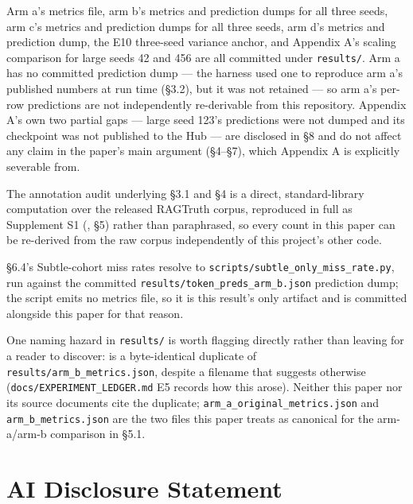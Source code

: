 \documentclass[11pt]{article}
\begin{document}
Arm a's metrics file, arm b's metrics and prediction dumps for all three seeds, arm c's
metrics and prediction dumps for all three seeds, arm d's metrics and prediction dump, the
E10 three-seed variance anchor, and Appendix A's scaling comparison for large seeds 42 and
456 are all committed under \texttt{results/}. Arm a has no committed prediction dump --- the harness
used one to reproduce arm a's published numbers at run time (§3.2), but it was not
retained --- so arm a's per-row predictions are not independently re-derivable from this
repository. Appendix A's own two partial gaps --- large seed 123's predictions were not
dumped and its checkpoint was not published to the Hub --- are disclosed in §8 and do not
affect any claim in the paper's main argument (§4--§7), which Appendix A is explicitly
severable from.

The annotation audit underlying §3.1 and §4 is a direct, standard-library computation over
the released RAGTruth corpus, reproduced in full as Supplement S1
(\texttt{}, §5) rather than paraphrased, so every count in
this paper can be re-derived from the raw corpus independently of this project's other
code.

§6.4's Subtle-cohort miss rates resolve to \texttt{scripts/subtle\_only\_miss\_rate.py}, run against the
committed \texttt{results/token\_preds\_arm\_b.json} prediction dump; the script emits no metrics file,
so it is this result's only artifact and is committed alongside this paper for that reason.

\begin{sloppypar}
One naming hazard in \texttt{results/} is worth flagging directly rather than leaving for a reader to
discover: \texttt{} is a byte-identical duplicate of
\texttt{results/arm\_b\_metrics.json}, despite a filename that suggests otherwise
(\texttt{docs/EXPERIMENT\_LEDGER.md} E5 records how this arose). Neither this paper nor its source
documents cite the duplicate; \texttt{arm\_a\_original\_metrics.json} and \texttt{arm\_b\_metrics.json} are the
two files this paper treats as canonical for the arm-a/arm-b comparison in §5.1.
\end{sloppypar}

\section{AI Disclosure Statement}\label{ai-disclosure-statement}
\end{document}
